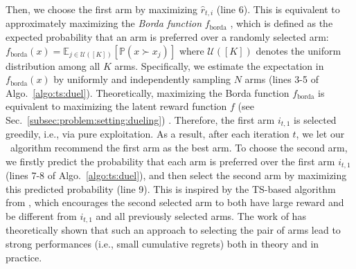 Then, we choose the first arm by maximizing $\widehat{r}_{t,i}$ (line 6).
This is equivalent to approximately maximizing the \emph{Borda function} $f_{\text{borda}}$ \cite{xu2020zeroth}, which is defined as the expected probability that an arm is preferred over a randomly selected arm: $f_{\text{borda}}(x)=\mathbb{E}_{j\in\mathcal{U}([K])}[\mathbb{P}(x \succ x_j)]$ where $\mathcal{U}([K])$ denotes the uniform distribution among all $K$ arms.
Specifically, we estimate the expectation in $f_{\text{borda}}(x)$ by uniformly and independently sampling $N$ arms (lines 3-5 of Algo.~\ref{algo:ts:duel}).
Theoretically, maximizing the Borda function $f_{\text{borda}}$ is equivalent to maximizing the latent reward function $f$ (see Sec.~\ref{subsec:problem:setting:dueling}) \cite{mehta2023sample}.
Therefore, the first arm $i_{t,1}$ is selected greedily, i.e., via pure exploitation.
As a result, after each iteration $t$, we let our \algtsduel~algorithm recommend the first arm as the best arm.
To choose the second arm, we firstly predict the probability that each arm is preferred over the first arm $i_{t,1}$ (lines 7-8 of Algo.~\ref{algo:ts:duel}), and then select the second arm by maximizing this predicted probability (line 9).
This is 
inspired by the TS-based algorithm from \citet{verma2024neural}, which encourages the second selected arm to both have large reward and be different from $i_{t,1}$ and all previously selected arms.
The work of \citet{verma2024neural} has theoretically shown that such an approach to selecting the pair of arms lead to strong performances (i.e., small cumulative regrets) both in theory and in practice.


